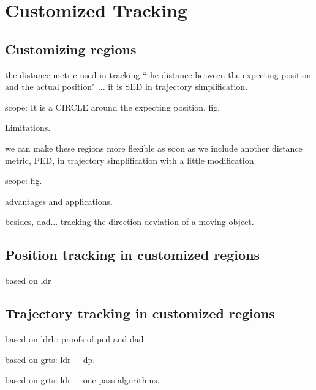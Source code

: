 

\section{Customized Tracking}
\label{sec:position}


\subsection{Customizing regions}

the distance metric used in tracking ``the distance between the expecting position and the actual position" ... it is SED in trajectory simplification. 

scope: It is  a CIRCLE around the expecting position. fig.

Limitations.

we can make these regions more flexible as soon as we include another distance metric, PED, in trajectory simplification with a little modification.

scope: fig.

advantages and applications.

besides, dad... tracking the direction deviation of a moving object.
 
\subsection{Position tracking in customized regions}
based on ldr


\subsection{Trajectory tracking in customized regions}
based on ldrh: proofs of ped and dad

based on grts: ldr + dp. 

based on grts: ldr + one-pass algorithms. 